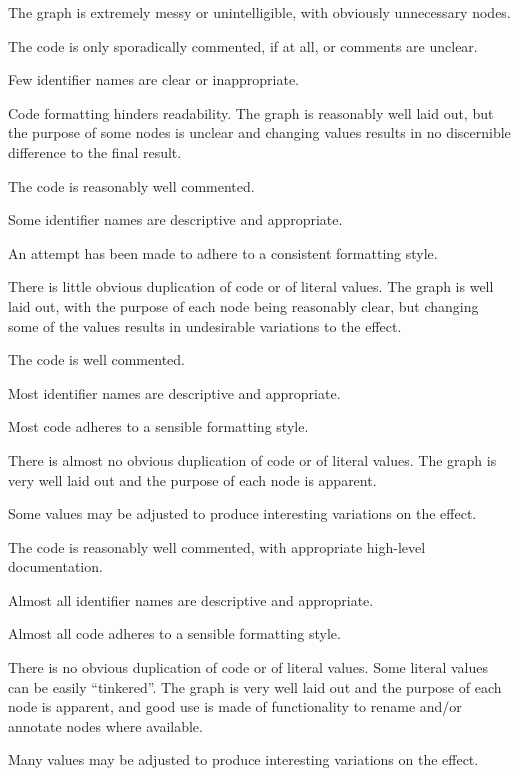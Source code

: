 \documentclass{../../../fal_assignment}
\begin{document}
\begin{markingrubric}
        \grade \fail The graph is extremely messy or unintelligible, with obviously unnecessary nodes.
		\par The code is only sporadically commented, if at all, or comments are unclear.
		\par Few identifier names are clear or inappropriate.
		\par Code formatting hinders readability.
	\grade The graph is reasonably well laid out, but the purpose of some nodes is unclear and changing values results in no discernible difference to the final result.
		\par The code is reasonably well commented.
		\par Some identifier names are descriptive and appropriate.
		\par An attempt has been made to adhere to a consistent formatting style.
		\par There is little obvious duplication of code or of literal values.           
	\grade The graph is well laid out, with the purpose of each node being reasonably clear, but changing some of the values results in undesirable variations to the effect.
		\par The code is well commented.
		\par Most identifier names are descriptive and appropriate.
		\par Most code adheres to a sensible formatting style.
		\par There is almost no obvious duplication of code or of literal values.   
	\grade The graph is very well laid out and the purpose of each node is apparent.
		\par Some values may be adjusted to produce interesting variations on the effect.
		\par The code is reasonably well commented, with appropriate high-level documentation.
		\par Almost all identifier names are descriptive and appropriate.
		\par Almost all code adheres to a sensible formatting style.
		\par There is no obvious duplication of code or of literal values. Some literal values can be easily ``tinkered''. 
	\grade The graph is very well laid out and the purpose of each node is apparent, and good use is made of functionality to rename and/or annotate nodes where available.
		\par Many values may be adjusted to produce interesting variations on the effect.

\end{markingrubric}
\end{document}
